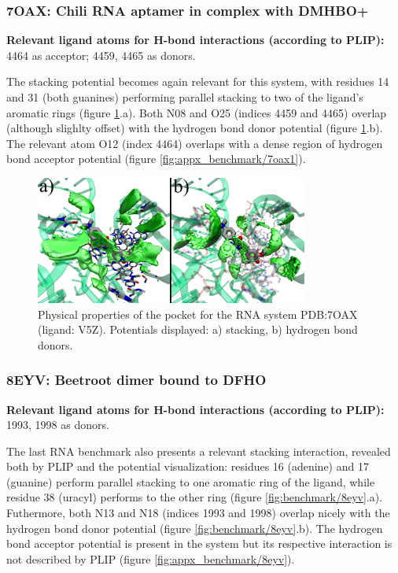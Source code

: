     \subsubsection{7OAX: Chili RNA aptamer in complex with DMHBO+}
      \textbf{Relevant ligand atoms for H-bond interactions (according to PLIP):} 4464 as acceptor; 4459, 4465 as donors.

      The stacking potential becomes again relevant for this system, with residues 14 and 31 (both guanines) performing parallel stacking to two of the ligand's aromatic rings (figure \ref{fig:benchmark/7oax1}.a). Both N08 and O25 (indices 4459 and 4465) overlap (although slighlty offset) with the hydrogen bond donor potential (figure \ref{fig:benchmark/7oax1}.b). The relevant atom O12 (index 4464) overlaps with a dense region of hydrogen bond acceptor potential (figure \ref{fig:appx_benchmark/7oax1}).

      \begin{figure}[H]
        \centering
        \includegraphics[width=0.8\textwidth]{figures/results/benchmark_rna/7oax1.png}
        \caption{\label{fig:benchmark/7oax1} Physical properties of the pocket for the RNA system PDB:7OAX (ligand: V5Z). Potentials displayed: a) stacking, b) hydrogen bond donors.}
      \end{figure}
    \pagebreak

    \subsubsection{8EYV: Beetroot dimer bound to DFHO}
      \textbf{Relevant ligand atoms for H-bond interactions (according to PLIP):} 1993, 1998 as donors.

      The last RNA benchmark also presents a relevant stacking interaction, revealed both by PLIP and the potential visualization: residues 16 (adenine) and 17 (guanine) perform parallel stacking to one aromatic ring of the ligand, while residue 38 (uracyl) performs to the other ring (figure \ref{fig:benchmark/8eyv}.a). Futhermore, both N13 and N18 (indices 1993 and 1998) overlap nicely with the hydrogen bond donor potential (figure \ref{fig:benchmark/8eyv}.b). The hydrogen bond acceptor potential is present in the system but its respective interaction is not described by PLIP (figure \ref{fig:appx_benchmark/8eyv}).

